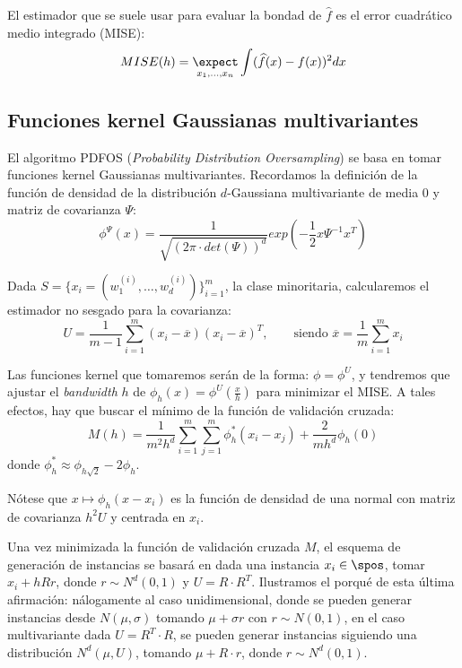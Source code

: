 El estimador que se suele usar para evaluar la bondad de $\widehat{f}$ es el error cuadrático medio integrado (MISE):
\[
  MISE(h) = \underset{x_1, \ldots, x_n}{\expect} \int (\widehat{f}(x) - f(x))^2 dx
\]



\subsection{Funciones kernel Gaussianas multivariantes}
El algoritmo PDFOS (\textit{Probability Distribution Oversampling}) se basa en tomar funciones kernel Gaussianas multivariantes.
Recordamos la definición de la función de densidad de la distribución $d$-Gaussiana multivariante de media 
$0$ y matriz de covarianza $\Psi$:
\[
  \phi^{\Psi}(x) = \frac{1}{\sqrt{(2\pi \cdot det(\Psi))^d}} exp\left(-\frac{1}{2} x \Psi^{-1} x^T \right)
\]

Dada $S = \{x_i = (w_1^{(i)}, \ldots, w_d^{(i)})\}_{i=1}^m$, la clase minoritaria, calcularemos el estimador no sesgado 
para la covarianza:
\[
  U = \frac{1}{m-1} \sum_{i=1}^m (x_i - \overline{x})(x_i - \overline{x})^T, 
  \qquad \textrm{siendo } \overline{x} = \frac{1}{m}\sum_{i=1}^m x_i
\]
  
Las funciones kernel que tomaremos serán de la forma: $\phi = \phi^{U}$, y tendremos que ajustar el \textit{bandwidth} $h$ de
$\phi_h(x) = \phi^U\left(\frac{x}{h}\right)$ para minimizar el MISE. A tales efectos, hay que buscar el mínimo de
la función de validación cruzada:
\begin{equation}
 M(h) = \frac{1}{m^2 h^d} \sum_{i=1}^m \sum_{j=1}^m \phi_h^{\ast} (x_i - x_j) + \frac{2}{m h^d} \phi_h(0)
 \label{eq:cross-val}
\end{equation}
donde $\phi_h^{\ast} \approx \phi_{h\sqrt{2}} - 2\phi_h$.

Nótese que $x\mapsto \phi_h(x-x_i)$ es la función de densidad de una normal con matriz de covarianza $h^2 U$ y centrada en $x_i$.

Una vez minimizada la función de validación cruzada $M$, el esquema de generación de instancias se basará en dada una instancia
$x_i \in \spos$, tomar $x_i + h R r$, donde $r\sim N^d(0,1)$ y $U = R\cdot R^T$. Ilustramos el porqué de esta última afirmación:
nálogamente al caso unidimensional, donde se pueden generar instancias desde $N(\mu, \sigma)$ tomando $\mu + \sigma r$
con $r\sim N(0,1)$, en el caso multivariante dada $U =  R^T \cdot R$, se pueden generar instancias siguiendo una distribución $N^d(\mu, U)$,
tomando $\mu + R \cdot r$, donde $r\sim N^d(0,1)$.

